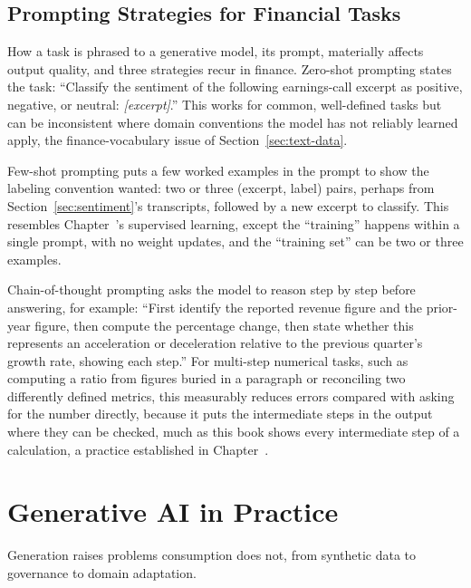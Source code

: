 \documentclass[../ai_in_finance]{subfiles}
\begin{document}
\subsection{Prompting Strategies for Financial Tasks}
\label{sec:prompting}

How a task is phrased to a generative model, its prompt, materially affects output quality, and three strategies recur in finance. Zero-shot prompting states the task: ``Classify the sentiment of the following earnings-call excerpt as positive, negative, or neutral: \emph{[excerpt]}.'' This works for common, well-defined tasks but can be inconsistent where domain conventions the model has not reliably learned apply, the finance-vocabulary issue of Section~\ref{sec:text-data}.

Few-shot prompting puts a few worked examples in the prompt to show the labeling convention wanted: two or three (excerpt, label) pairs, perhaps from Section~\ref{sec:sentiment}'s transcripts, followed by a new excerpt to classify. This resembles Chapter~'s supervised learning, except the ``training'' happens within a single prompt, with no weight updates, and the ``training set'' can be two or three examples.

Chain-of-thought prompting asks the model to reason step by step before answering, for example: ``First identify the reported revenue figure and the prior-year figure, then compute the percentage change, then state whether this represents an acceleration or deceleration relative to the previous quarter's growth rate, showing each step.'' For multi-step numerical tasks, such as computing a ratio from figures buried in a paragraph or reconciling two differently defined metrics, this measurably reduces errors compared with asking for the number directly, because it puts the intermediate steps in the output where they can be checked, much as this book shows every intermediate step of a calculation, a practice established in Chapter~.

\section{Generative AI in Practice}

Generation raises problems consumption does not, from synthetic data to governance to domain adaptation.
\end{document}
